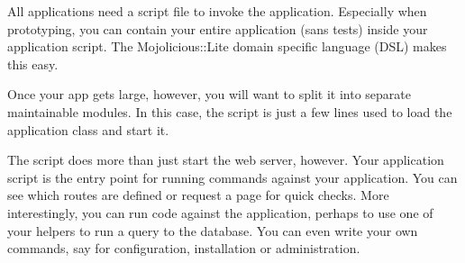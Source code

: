 All applications need a script file to invoke the application.
Especially when prototyping, you can contain your entire application (sans tests) inside your application script.
The Mojolicious::Lite domain specific language (DSL) makes this easy.

Once your app gets large, however, you will want to split it into separate maintainable modules.
In this case, the script is just a few lines used to load the application class and start it.

The script does more than just start the web server, however.
Your application script is the entry point for running commands against your application.
You can see which routes are defined or request a page for quick checks.
More interestingly, you can run code against the application, perhaps to use one of your helpers to run a query to the database.
You can even write your own commands, say for configuration, installation or administration.

